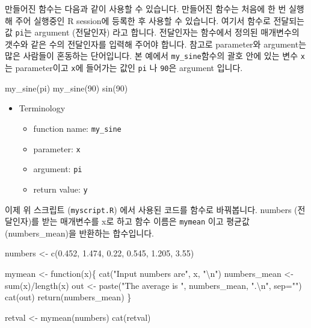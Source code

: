 \documentclass[
  a4paper,
]{book}
\newenvironment{Shaded}{\begin{snugshade}}{\end{snugshade}}
\newcommand{\AttributeTok}[1]{\textcolor[rgb]{0.40,0.45,0.13}{#1}}
\newcommand{\ControlFlowTok}[1]{\textcolor[rgb]{0.00,0.23,0.31}{#1}}
\newcommand{\DecValTok}[1]{\textcolor[rgb]{0.68,0.00,0.00}{#1}}
\newcommand{\FloatTok}[1]{\textcolor[rgb]{0.68,0.00,0.00}{#1}}
\newcommand{\FunctionTok}[1]{\textcolor[rgb]{0.28,0.35,0.67}{#1}}
\newcommand{\NormalTok}[1]{\textcolor[rgb]{0.00,0.23,0.31}{#1}}
\newcommand{\OtherTok}[1]{\textcolor[rgb]{0.00,0.23,0.31}{#1}}
\newcommand{\SpecialCharTok}[1]{\textcolor[rgb]{0.37,0.37,0.37}{#1}}
\newcommand{\StringTok}[1]{\textcolor[rgb]{0.13,0.47,0.30}{#1}}
\providecommand{\tightlist}{%
  \setlength{\itemsep}{0pt}\setlength{\parskip}{0pt}}\usepackage{longtable,booktabs,array}
\begin{document}
만들어진 함수는 다음과 같이 사용할 수 있습니다. 만들어진 함수는 처음에
한 번 실행해 주어 실행중인 R session에 등록한 후 사용할 수 있습니다.
여기서 함수로 전달되는 값 \texttt{pi}는 argument (전달인자) 라고 합니다.
전달인자는 함수에서 정의된 매개변수의 갯수와 같은 수의 전달인자를 입력해
주어야 합니다. 참고로 parameter와 argument는 많은 사람들이 혼동하는
단어입니다. 본 예에서 \texttt{my\_sine}함수의 괄호 안에 있는 변수
\texttt{x}는 parameter이고 \texttt{x}에 들어가는 값인 \texttt{pi} 나
\texttt{90}은 argument 입니다.

\begin{Shaded}
\begin{Highlighting}[]
\FunctionTok{my\_sine}\NormalTok{(pi)}
\FunctionTok{my\_sine}\NormalTok{(}\DecValTok{90}\NormalTok{)}
\FunctionTok{sin}\NormalTok{(}\DecValTok{90}\NormalTok{)}
\end{Highlighting}
\end{Shaded}

\begin{itemize}
\item
  Terminology

  \begin{itemize}
  \tightlist
  \item
    function name: \texttt{my\_sine}
  \item
    parameter: \texttt{x}
  \item
    argument: \texttt{pi}
  \item
    return value: \texttt{y}
  \end{itemize}
\end{itemize}

이제 위 스크립트 (\texttt{myscript.R}) 에서 사용된 코드를 함수로
바꿔봅니다. numbers (전달인자)를 받는 매개변수를 x로 하고 함수 이름은
\texttt{mymean} 이고 평균값 (numbers\_mean)을 반환하는 합수입니다.

\begin{Shaded}
\begin{Highlighting}[]
\NormalTok{numbers }\OtherTok{\textless{}{-}} \FunctionTok{c}\NormalTok{(}\FloatTok{0.452}\NormalTok{, }\FloatTok{1.474}\NormalTok{, }\FloatTok{0.22}\NormalTok{, }\FloatTok{0.545}\NormalTok{, }\FloatTok{1.205}\NormalTok{, }\FloatTok{3.55}\NormalTok{)}

\NormalTok{mymean }\OtherTok{\textless{}{-}} \ControlFlowTok{function}\NormalTok{(x)\{}
  \FunctionTok{cat}\NormalTok{(}\StringTok{"Input numbers are"}\NormalTok{, x, }\StringTok{"}\SpecialCharTok{\textbackslash{}n}\StringTok{"}\NormalTok{)}
\NormalTok{  numbers\_mean }\OtherTok{\textless{}{-}} \FunctionTok{sum}\NormalTok{(x)}\SpecialCharTok{/}\FunctionTok{length}\NormalTok{(x)}
\NormalTok{  out }\OtherTok{\textless{}{-}} \FunctionTok{paste}\NormalTok{(}\StringTok{"The average is "}\NormalTok{, numbers\_mean, }\StringTok{".}\SpecialCharTok{\textbackslash{}n}\StringTok{"}\NormalTok{, }\AttributeTok{sep=}\StringTok{""}\NormalTok{)}
  \FunctionTok{cat}\NormalTok{(out)}
  \FunctionTok{return}\NormalTok{(numbers\_mean)}
\NormalTok{\}}

\NormalTok{retval }\OtherTok{\textless{}{-}} \FunctionTok{mymean}\NormalTok{(numbers)}
\FunctionTok{cat}\NormalTok{(retval)}
\end{Highlighting}
\end{Shaded}
\end{document}
